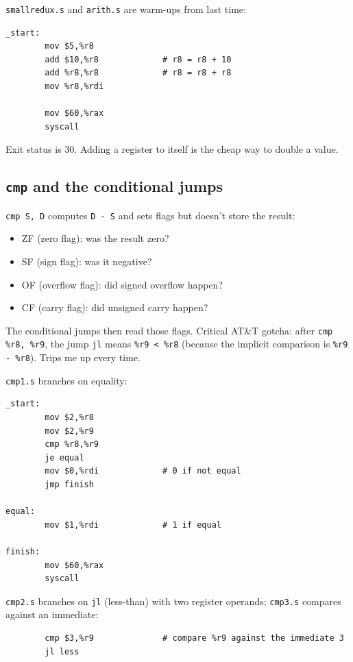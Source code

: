 \documentclass[11pt]{article}
\begin{document}
\texttt{smallredux.s} and \texttt{arith.s} are warm-ups from last
time:

\begin{lstlisting}
_start:
        mov $5,%r8
        add $10,%r8             # r8 = r8 + 10
        add %r8,%r8             # r8 = r8 + r8
        mov %r8,%rdi

        mov $60,%rax
        syscall
\end{lstlisting}

Exit status is 30. Adding a register to itself is the cheap way to
double a value.

\subsection*{\texttt{cmp} and the conditional jumps}

\texttt{cmp S, D} computes \texttt{D - S} and sets flags but
doesn't store the result:
\begin{itemize}
  \item ZF (zero flag): was the result zero?
  \item SF (sign flag): was it negative?
  \item OF (overflow flag): did signed overflow happen?
  \item CF (carry flag): did unsigned carry happen?
\end{itemize}
The conditional jumps then read those flags. Critical AT\&T
gotcha: after \texttt{cmp \%r8, \%r9}, the jump \texttt{jl} means
\texttt{\%r9 < \%r8} (because the implicit comparison is
\texttt{\%r9 - \%r8}). Trips me up every time.

\texttt{cmp1.s} branches on equality:

\begin{lstlisting}
_start:
        mov $2,%r8
        mov $2,%r9
        cmp %r8,%r9
        je equal
        mov $0,%rdi             # 0 if not equal
        jmp finish

equal:
        mov $1,%rdi             # 1 if equal

finish:
        mov $60,%rax
        syscall
\end{lstlisting}

\texttt{cmp2.s} branches on \texttt{jl} (less-than) with two
register operands; \texttt{cmp3.s} compares against an immediate:

\begin{lstlisting}
        cmp $3,%r9              # compare %r9 against the immediate 3
        jl less
\end{lstlisting}
\end{document}
